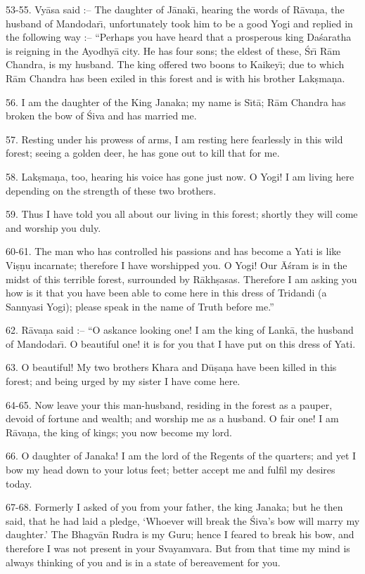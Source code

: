 53-55. Vy\=asa said :-- The daughter of J\=anak\={\i}, hearing the words of R\=ava\d{n}a, the husband of Mandodar\={\i}, unfortunately took him to be a good Yogi and replied in the following way :-- ``Perhaps you have heard that a prosperous king Da\'saratha is reigning in the Ayodhy\=a city. He has four sons; the eldest of these, \'Sr\={\i} R\=am Chandra, is my husband. The king offered two boons to Kaikey\={\i}; due to which R\=am Chandra has been exiled in this forest and is with his brother Lak\d{s}ma\d{n}a.

56. I am the daughter of the King Janaka; my name is S\={\i}t\=a; R\=am Chandra has broken the bow of \'Siva and has married me.

57. Resting under his prowess of arms, I am resting here fearlessly in this wild forest; seeing a golden deer, he has gone out to kill that for me.

58. Lak\d{s}ma\d{n}a, too, hearing his voice has gone just now. O Yogi! I am living here depending on the strength of these two brothers.

59. Thus I have told you all about our living in this forest; shortly they will come and worship you duly.

60-61. The man who has controlled his passions and has become a Yati is like Vi\d{s}\d{n}u incarnate; therefore I have worshipped you. O Yogi! Our \=A\'sram is in the midst of this terrible forest, surrounded by R\=akh\d{s}asas. Therefore I am asking you how is it that you have been able to come here in this dress of Tridandi (a Sannyasi Yogi); please speak in the name of Truth before me.''

62. R\=ava\d{n}a said :-- ``O askance looking one! I am the king of Lank\=a, the husband of Mandodar\={\i}. O beautiful one! it is for you that I have put on this dress of Yati.

63. O beautiful! My two brothers Khara and D\=u\d{s}a\d{n}a have been killed in this forest; and being urged by my sister I have come here.

64-65. Now leave your this man-husband, residing in the forest as a pauper, devoid of fortune and wealth; and worship me as a husband. O fair one! I am R\=ava\d{n}a, the king of kings; you now become my lord.

66. O daughter of Janaka! I am the lord of the Regents of the quarters; and yet I bow my head down to your lotus feet; better accept me and fulfil my desires today.

67-68. Formerly I asked of you from your father, the king Janaka; but he then said, that he had laid a pledge, `Whoever will break the \'Siva's bow will marry my daughter.' The Bhagv\=an Rudra is my Guru; hence I feared to break his bow, and therefore I was not present in your Svayamvara. But from that time my mind is always thinking of you and is in a state of bereavement for you.

